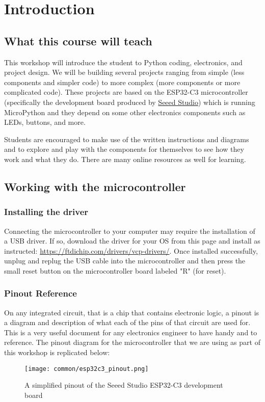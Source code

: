 \chapter{Introduction}
\section{What this course will teach}
This workshop will introduce the student to Python coding, electronics, and project
design. We will be building several projects ranging from simple (less components and
simpler code) to more complex (more components or more complicated code). These projects
are based on the ESP32-C3 microcontroller (specifically the development board produced by
\href{https://www.seeedstudio.com/Seeed-XIAO-ESP32C3-p-5431.html}{Seeed Studio}) which is
running MicroPython and they depend on some other electronics components such as LEDs,
buttons, and more.

Students are encouraged to make use of the written instructions and diagrams and to
explore and play with the components for themselves to see how they work and what
they do. There are many online resources as well for learning.

\section{Working with the microcontroller}
\subsection{Installing the driver}
Connecting the microcontroller to your computer may require the installation of a
USB driver. If so, download the driver for your OS from this page and install as instructed:
\url{https://ftdichip.com/drivers/vcp-drivers/}. Once installed successfully, unplug and replug
the USB cable into the microcontroller and then press the small reset button on the
microcontroller board labeled "R" (for reset).

\subsection{Pinout Reference} \label{pinout}
On any integrated circuit, that is a chip that contains electronic logic, a pinout is
a diagram and description of what each of the pins of that circuit are used for. This is
a very useful document for any electronics engineer to have handy and to reference. The
pinout diagram for the microcontroller that we are using as part of this workshop is
replicated below:
\begin{figure}[H]
\centering
    \texttt{[image: common/esp32c3\_pinout.png]}
    \caption{A simplified pinout of the Seeed Studio ESP32-C3 development board}
\end{figure}

